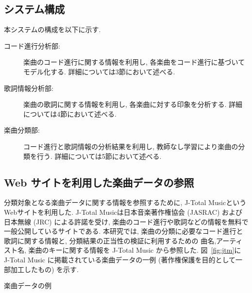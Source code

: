 \documentclass{jpreprint}
\begin{document}
\begin{multicols}{2}
\subsection{システム構成}
本システムの構成を以下に示す.
\begin{description}
  \item[コード進行分析部:]
    楽曲のコード進行に関する情報を利用し, 
    各楽曲をコード進行に基づいてモデル化する.
    詳細については3節において述べる.
  \item[歌詞情報分析部:]
    楽曲の歌詞に関する情報を利用し, 
    各楽曲に対する印象を分析する.
    詳細については4節において述べる.
  \item[楽曲分類部:]
    コード進行と歌詞情報の分析結果を利用し,
    教師なし学習により楽曲の分類を行う.
    詳細については5節において述べる.
\end{description}
 
\subsection{Web サイトを利用した楽曲データの参照}
分類対象となる楽曲データに関する情報を参照するために,
J-Total Music\cite{JTM}というWebサイトを利用した.
J-Total Musicは日本音楽著作権協会 (JASRAC) および
日本無線 (JRC) による許諾を受け,
楽曲のコード進行や歌詞などの情報を無料で一般公開しているサイトである.
本研究では,
楽曲の分類に必要なコード進行と歌詞に関する情報と,
分類結果の正当性の検証に利用するための
曲名,アーティスト名, 
楽曲のキーに関する情報を J-Total Music から参照した.
図~\ref{fig:jtm}に J-Total Music に掲載されている楽曲データの一例
(著作権保護を目的として一部加工したもの) を示す.

\begin{figurehere}
  \begin{center}
  \caption{楽曲データの例}
  \label{fig:jtm}
  \end{center}
\end{figurehere}


\end{multicols}
\end{document}
